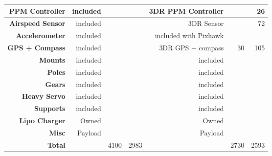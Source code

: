 \begin{landscape}
\begin{table}[!htbp]
\begin{tabular}{|r|r|r|r|r|r|r|}
			\hline
			\textbf{PPM Controller}  & included                   &            &       & 3DR PPM Controller         &            & 26    \\
			\hline
			\textbf{Airspeed Sensor} & included                   &            &       & 3DR Sensor                 &            & 72    \\
			\hline
			\textbf{Accelerometer}   & included                   &            &       & included with Pixhawk      &            &       \\
			\hline
			\textbf{GPS + Compass}   & included                   &            &       & 3DR GPS + compass          & 30         & 105   \\
			\hline
			\textbf{Mounts}          & included                   &            &       & included                   &            &       \\
			\hline
			\textbf{Poles}           & included                   &            &       & included                   &            &       \\
			\hline
			\textbf{Gears}           & included                   &            &       & included                   &            &       \\
			\hline
			\textbf{Heavy Servo}     & included                   &            &       & included                   &            &       \\
			\hline
			\textbf{Supports}        & included                   &            &       & included                   &            &       \\
			\hline
			\textbf{Lipo Charger}    & Owned                      &            &       & Owned                      &            &       \\
			\hline
			\textbf{Misc}            & Payload                    &            &       & Payload                    &            &       \\
			\hline
			\textbf{Total}           &                            & 4100       & 2983  &                            & 2730       & 2593  \\
			\hline
		\end{tabular} 
		\label{tab:fireflycosts}
	\end{table}
\end{landscape}

